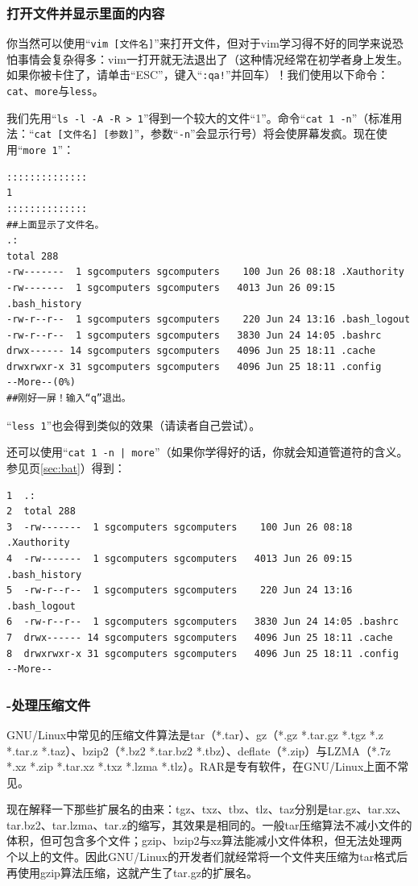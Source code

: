 \subsubsection{打开文件并显示里面的内容}
你当然可以使用“\verb|vim [文件名]|”来打开文件，但对于vim学习得不好的同学来说恐怕事情会复杂得多：vim一打开就无法退出了（这种情况经常在初学者身上发生。如果你被卡住了，请单击“ESC”，键入“\verb|:qa!|”并回车）！我们使用以下命令：\verb|cat|、\verb|more|与\verb|less|。\par
我们先用“\verb|ls -l -A -R > 1|”得到一个较大的文件“1”。命令“\verb|cat 1 -n|”（标准用法：“\verb|cat [文件名] [参数]|”，参数“\verb|-n|”会显示行号）将会使屏幕发疯。现在使用“\verb|more 1|”：
\begin{verbatim}
::::::::::::::
1
::::::::::::::
##上面显示了文件名。
.:
total 288
-rw-------  1 sgcomputers sgcomputers    100 Jun 26 08:18 .Xauthority
-rw-------  1 sgcomputers sgcomputers   4013 Jun 26 09:15 .bash_history
-rw-r--r--  1 sgcomputers sgcomputers    220 Jun 24 13:16 .bash_logout
-rw-r--r--  1 sgcomputers sgcomputers   3830 Jun 24 14:05 .bashrc
drwx------ 14 sgcomputers sgcomputers   4096 Jun 25 18:11 .cache
drwxrwxr-x 31 sgcomputers sgcomputers   4096 Jun 25 18:11 .config
--More--(0%)
##刚好一屏！输入“q”退出。
\end{verbatim} \par
“\verb|less 1|”也会得到类似的效果（请读者自己尝试）。\par
还可以使用“\verb/cat 1 -n | more/”（如果你学得好的话，你就会知道管道符的含义。参见\pageref{sec:bat}页\ref{sec:bat}）得到：
\begin{verbatim}
1  .:
2  total 288
3  -rw-------  1 sgcomputers sgcomputers    100 Jun 26 08:18 .Xauthority
4  -rw-------  1 sgcomputers sgcomputers   4013 Jun 26 09:15 .bash_history
5  -rw-r--r--  1 sgcomputers sgcomputers    220 Jun 24 13:16 .bash_logout
6  -rw-r--r--  1 sgcomputers sgcomputers   3830 Jun 24 14:05 .bashrc
7  drwx------ 14 sgcomputers sgcomputers   4096 Jun 25 18:11 .cache
8  drwxrwxr-x 31 sgcomputers sgcomputers   4096 Jun 25 18:11 .config
--More--
\end{verbatim}
\subsubsection{-处理压缩文件}
GNU/Linux中常见的压缩文件算法是tar（*.tar）、gz（*.gz *.tar.gz *.tgz *.z *.tar.z *.taz）、bzip2（*.bz2 *.tar.bz2 *.tbz）、deflate（*.zip）与LZMA（*.7z *.xz *.zip *.tar.xz *.txz *.lzma *.tlz）。RAR是专有软件，在GNU/Linux上面不常见。\par
现在解释一下那些扩展名的由来：tgz、txz、tbz、tlz、taz分别是tar.gz、tar.xz、tar.bz2、tar.lzma、tar.z的缩写，其效果是相同的。一般tar压缩算法不减小文件的体积，但可包含多个文件；gzip、bzip2与xz算法能减小文件体积，但无法处理两个以上的文件。因此GNU/Linux的开发者们就经常将一个文件夹压缩为tar格式后再使用gzip算法压缩，这就产生了tar.gz的扩展名。\par
